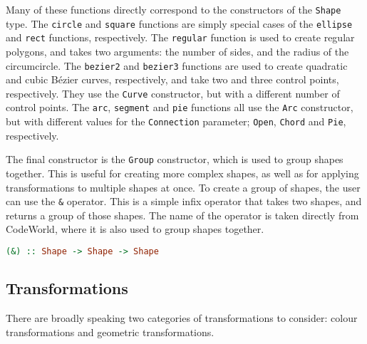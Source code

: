 \documentclass[../main.tex]{subfiles}
\begin{document}
                Many of these functions directly correspond to the constructors of the
                    \texttt{Shape} type.
                The \texttt{circle} and \texttt{square} functions are simply special cases of
                    the \texttt{ellipse} and \texttt{rect} functions, respectively.
                The \texttt{regular} function is used to create regular polygons, and takes two
                    arguments: the number of sides, and the radius of the circumcircle.
                The \texttt{bezier2} and \texttt{bezier3} functions are used to create
                    quadratic and cubic Bézier curves, respectively, and take two and three control
                    points, respectively.
                They use the \texttt{Curve} constructor, but with a different number of control
                    points.
                The \texttt{arc}, \texttt{segment} and \texttt{pie} functions all use the
                    \texttt{Arc} constructor, but with different values for the \texttt{Connection}
                    parameter; \texttt{Open}, \texttt{Chord} and \texttt{Pie}, respectively.

                The final constructor is the \texttt{Group} constructor, which is used to group
                    shapes together.
                This is useful for creating more complex shapes, as well as for applying
                    transformations to multiple shapes at once.
                To create a group of shapes, the user can use the \verb|&| operator.
                This is a simple infix operator that takes two shapes, and returns a group of
                    those shapes.
                The name of the operator is taken directly from CodeWorld, where it is also
                    used to group shapes together.

                \begin{lstlisting}[language={Haskell}, label={lst:group}, caption={The group (\texttt{\&}) operator.}]
(&) :: Shape -> Shape -> Shape\end{lstlisting}

        \subsection{Transformations}
            There are broadly speaking two categories of transformations to consider:
                colour transformations and geometric transformations.
\end{document}
